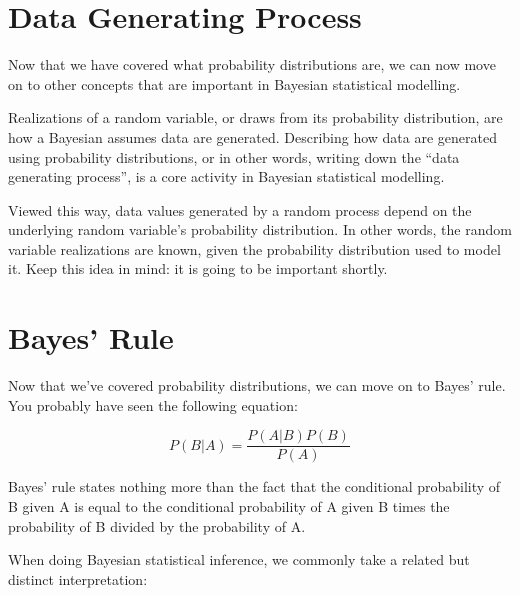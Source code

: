 \section{Data Generating Process}

Now that we have covered what probability distributions are, we can now move on to other concepts that are important in Bayesian statistical modelling.

Realizations of a random variable, or draws from its probability distribution, are how a Bayesian assumes data are generated. Describing how data are generated using probability distributions, or in other words, writing down the ``data generating process'', is a core activity in Bayesian statistical modelling.

Viewed this way, data values generated by a random process depend on the underlying random variable's probability distribution. In other words, the random variable realizations are known, given the probability distribution used to model it. Keep this idea in mind: it is going to be important shortly.

\section{Bayes' Rule}

Now that we've covered probability distributions, we can move on to Bayes' rule. You probably have seen the following equation:

\begin{equation}
P(B|A)=\frac{P(A|B)P(B)}{P(A)}
\end{equation}

Bayes' rule states nothing more than the fact that the conditional probability of B given A is equal to the conditional probability of A given B times the probability of B divided by the probability of A.

When doing Bayesian statistical inference, we commonly take a related but distinct interpretation:


